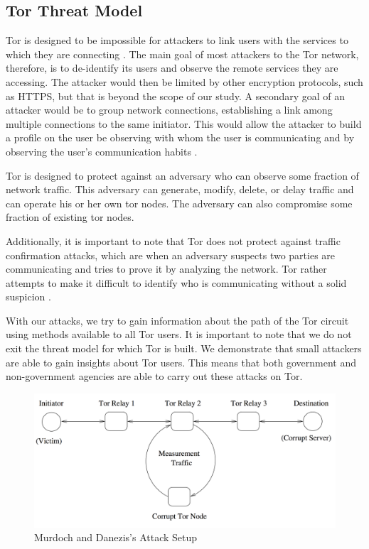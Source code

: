 \documentclass[12pt,journal]{IEEEtran}
\begin{document}
\subsection{Tor Threat Model}
Tor is designed to be impossible for attackers to link users with the services to which they are connecting \cite{Dingledine:2004:TSO:1251375.1251396}. The main goal of most attackers to the Tor network, therefore, is to de-identify its users and observe the remote services they are accessing. The attacker would then be limited by other encryption protocols, such as HTTPS, but that is beyond the scope of our study. A secondary goal of an attacker would be to group network connections, establishing a link among multiple connections to the same initiator. This would allow the attacker to build a profile on the user be observing with whom the user is communicating and by observing the user’s communication habits \cite{Murdoch:2005:LTA:1058433.1059390}.
\par
Tor is designed to protect against an adversary who can observe some fraction of network traffic. This adversary can generate, modify, delete, or delay traffic and can operate his or her own tor nodes. The adversary can also compromise some fraction of existing tor nodes\cite{Dingledine:2004:TSO:1251375.1251396}.
\par
Additionally, it is important to note that Tor does not protect against traffic confirmation attacks, which are when an adversary suspects two parties are communicating and tries to prove it by analyzing the network. Tor rather attempts to make it difficult to identify who is communicating without a solid suspicion \cite{Murdoch:2005:LTA:1058433.1059390}.
\par
With our attacks, we try to gain information about the path of the Tor circuit using methods available to all Tor users. It is important to note that we do not exit the threat model for which Tor is built. We demonstrate that small attackers are able to gain insights about Tor users. This means that both government and non-government agencies are able to carry out these attacks on Tor.

\begin{figure}

 \center
  \includegraphics[width=\textwidth]{figures/murdochattacksetup.png}
  \caption{Murdoch and Danezis's Attack Setup}
  \label{murdochsetup}
\end{figure}
\end{document}
